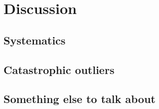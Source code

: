 \section{Discussion}
\label{sec:discussion}

\subsection{Systematics}
\label{sec:discussion-systematics}

\subsection{Catastrophic outliers}
\label{sec:discussion-catastrophic}

\subsection{Something else to talk about}